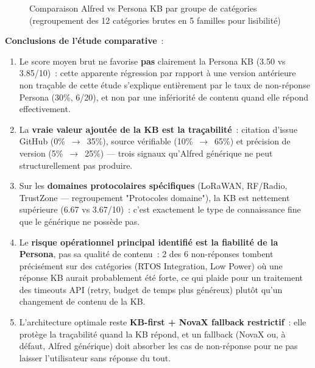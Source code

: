 \begin{figure}[H]
\centering
{}
\caption{Comparaison Alfred vs Persona KB par groupe de catégories (regroupement des 12 catégories brutes en 5 familles pour lisibilité)}
\label{fig:comparative_chart}
\end{figure}

\textbf{Conclusions de l'étude comparative}~:
\begin{enumerate}
  \item Le score moyen brut ne favorise \textbf{pas} clairement la Persona KB (3.50 vs 3.85/10)~: cette apparente régression par rapport à une version antérieure non traçable de cette étude s'explique entièrement par le taux de non-réponse Persona (30\%, 6/20), et non par une infériorité de contenu quand elle répond effectivement.
  \item La \textbf{vraie valeur ajoutée de la KB est la traçabilité}~: citation d'issue GitHub (0\%~$\to$~35\%), source vérifiable (10\%~$\to$~65\%) et précision de version (5\%~$\to$~25\%) --- trois signaux qu'Alfred générique ne peut structurellement pas produire.
  \item Sur les \textbf{domaines protocolaires spécifiques} (LoRaWAN, RF/Radio, TrustZone --- regroupement "Protocoles domaine"), la KB est nettement supérieure (6.67 vs 3.67/10)~: c'est exactement le type de connaissance fine que le générique ne possède pas.
  \item Le \textbf{risque opérationnel principal identifié est la fiabilité de la Persona}, pas sa qualité de contenu~: 2 des 6 non-réponses tombent précisément sur des catégories (RTOS Integration, Low Power) où une réponse KB aurait probablement été forte, ce qui plaide pour un traitement des timeouts API (retry, budget de temps plus généreux) plutôt qu'un changement de contenu de la KB.
  \item L'architecture optimale reste \textbf{KB-first + NovaX fallback restrictif}~: elle protège la traçabilité quand la KB répond, et un fallback (NovaX ou, à défaut, Alfred générique) doit absorber les cas de non-réponse pour ne pas laisser l'utilisateur sans réponse du tout.
\end{enumerate}

